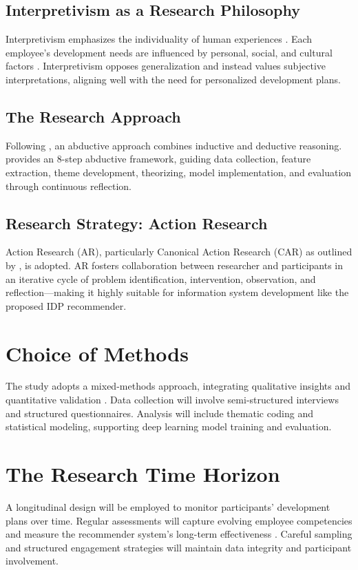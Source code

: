 \subsection{Interpretivism as a Research Philosophy}
Interpretivism emphasizes the individuality of human experiences \cite{irshaidat2019interpretivism, Saunders2012}. Each employee's development needs are influenced by personal, social, and cultural factors \cite{myers2008qualitative}. Interpretivism opposes generalization and instead values subjective interpretations, aligning well with the need for personalized development plans.

\subsection{The Research Approach}
Following \cite{mantere2013reasoning, hurley2021integrating}, an abductive approach combines inductive and deductive reasoning. \cite{thompson2022guide} provides an 8-step abductive framework, guiding data collection, feature extraction, theme development, theorizing, model implementation, and evaluation through continuous reflection.

\subsection{Research Strategy: Action Research}
Action Research (AR), particularly Canonical Action Research (CAR) as outlined by \cite{avison1999action, davison2021research}, is adopted. AR fosters collaboration between researcher and participants in an iterative cycle of problem identification, intervention, observation, and reflection—making it highly suitable for information system development like the proposed IDP recommender.

\section{Choice of Methods}
The study adopts a mixed-methods approach, integrating qualitative insights and quantitative validation \cite{oliveira2021mixed, guetterman2016distinguishes}. Data collection will involve semi-structured interviews and structured questionnaires. Analysis will include thematic coding and statistical modeling, supporting deep learning model training and evaluation.



\section{The Research Time Horizon}
A longitudinal design will be employed to monitor participants’ development plans over time. Regular assessments will capture evolving employee competencies and measure the recommender system's long-term effectiveness \cite{kelley2011sample, jung2023longitudinal}. Careful sampling and structured engagement strategies will maintain data integrity and participant involvement.

